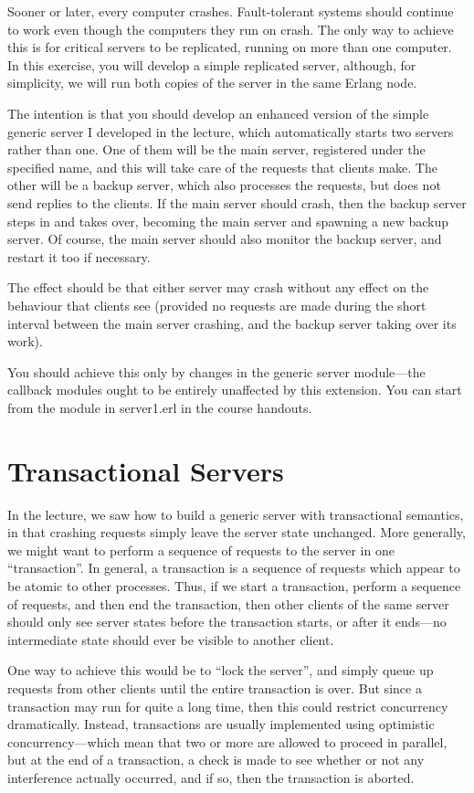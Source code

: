 \documentclass{article}
\begin{document}
Sooner or later, every computer crashes. Fault-tolerant systems should
continue to work even though the computers they run on crash. The only
way to achieve this is for critical servers to be replicated, running
on more than one computer. In this exercise, you will develop a simple
replicated server, although, for simplicity, we will run both copies
of the server in the same Erlang node.

The intention is that you should develop an enhanced version of the
simple generic server I developed in the lecture, which automatically
starts two servers rather than one. One of them will be the main
server, registered under the specified name, and this will take care
of the requests that clients make. The other will be a backup server,
which also processes the requests, but does not send replies to the
clients. If the main server should crash, then the backup server steps
in and takes over, becoming the main server and spawning a new backup
server. Of course, the main server should also monitor the backup
server, and restart it too if necessary.

The effect should be that either server may crash without any effect
on the behaviour that clients see (provided no requests are made
during the short interval between the main server crashing, and the
backup server taking over its work).

You should achieve this only by changes in the generic server
module—the callback modules ought to be entirely unaffected by this
extension. You can start from the module in \textsf{server1.erl} in
the course handouts.

\section{Transactional Servers}

In the lecture, we saw how to build a generic server with
transactional semantics, in that crashing requests simply leave the
server state unchanged. More generally, we might want to perform a
sequence of requests to the server in one “transaction”. In general, a
transaction is a sequence of requests which appear to be atomic to
other processes. Thus, if we start a transaction, perform a sequence
of requests, and then end the transaction, then other clients of the
same server should only see server states before the transaction
starts, or after it ends—no intermediate state should ever be visible
to another client.

One way to achieve this would be to “lock the server”, and simply
queue up requests from other clients until the entire transaction is
over.  But since a transaction may run for quite a long time, then
this could restrict concurrency dramatically. Instead, transactions
are usually implemented using optimistic concurrency—which mean that
two or more are allowed to proceed in parallel, but at the end of a
transaction, a check is made to see whether or not any interference
actually occurred, and if so, then the transaction is aborted.
\end{document}
